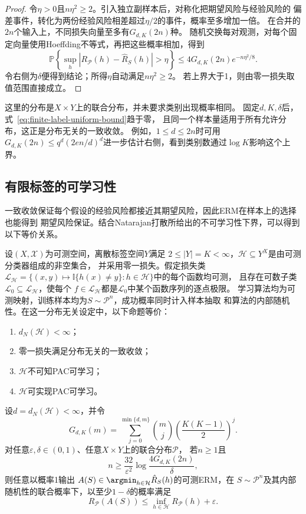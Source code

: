 \begin{proof}
令$\eta>0$且$n\eta^2\geq2$。引入独立副样本后，对称化把期望风险与经验风险的
偏差事件，转化为两份经验风险相差超过$\eta/2$的事件，概率至多增加一倍。
在合并的$2n$个输入上，不同损失向量至多有$G_{d,K}(2n)$种。
随机交换每对观测，对每个固定向量使用Hoeffding不等式，再把这些概率相加，得到
\[
 \mathbb P\!\left\{\sup_h|R_{\mathcal P}(h)-\hat R_S(h)|>\eta\right\}
 \leq4G_{d,K}(2n)e^{-n\eta^2/8}.
\]
令右侧为$\delta$便得到结论；所得$\eta$自动满足$n\eta^2\geq2$。
若上界大于1，则由零一损失取值范围直接成立。
\end{proof}

这里的分布是$X\times Y$上的联合分布，并未要求类别出现概率相同。
固定$d,K,\delta$后，式~\eqref{eq:finite-label-uniform-bound}趋于零，
且同一个样本量适用于所有允许分布，这正是分布无关的一致收敛。
例如，$1\leq d\leq2n$时可用
$G_{d,K}(2n)\leq q^d(2en/d)^d$进一步估计右侧，看到类别数通过$\log K$影响这个上界。

\subsection{有限标签的可学习性}

一致收敛保证每个假设的经验风险都接近其期望风险，因此ERM在样本上的选择也能得到
期望风险保证。结合Natarajan打散所给出的不可学习性下界，可以得到以下等价关系。

\begin{theorem}[有限标签的可学习性刻画]
\label{thm:finite-label-learnability}
设$(X,\mathcal X)$为可测空间，离散标签空间$Y$满足
$2\leq|Y|=K<\infty$，$\mathcal H\subseteq Y^X$是由可测分类器组成的非空集合，
并采用零一损失。假定损失类
$\mathcal L_{\mathcal H}
=\{(x,y)\mapsto\mathbb I\{h(x)\neq y\}:h\in\mathcal H\}$中的每个函数均可测，
且存在可数子类$\mathcal L_0\subseteq\mathcal L_{\mathcal H}$，使每个
$f\in\mathcal L_{\mathcal H}$都是$\mathcal L_0$中某个函数序列的逐点极限。
学习算法均为可测映射，训练样本均为$S\sim\mathcal P^n$，成功概率同时计入样本抽取
和算法的内部随机性。在这一分布无关设定中，以下命题等价：
\begin{enumerate}
 \item $d_N(\mathcal H)<\infty$；
 \item 零一损失满足分布无关的一致收敛；
 \item $\mathcal H$不可知PAC可学习；
 \item $\mathcal H$可实现PAC可学习。
\end{enumerate}

设$d=d_N(\mathcal H)<\infty$，并令
\[
 G_{d,K}(m)=\sum_{j=0}^{\min\{d,m\}}\binom mj
 \left(\frac{K(K-1)}2\right)^j.
\]
对任意$\varepsilon,\delta\in(0,1)$、任意$X\times Y$上的联合分布$\mathcal P$，
若$n\geq1$且
\[
 n\geq\frac{32}{\varepsilon^2}\log\frac{4G_{d,K}(2n)}{\delta},
\]
则任意以概率1输出
$A(S)\in\argmin_{h\in\mathcal H}\hat R_S(h)$的可测ERM，在
$S\sim\mathcal P^n$及其内部随机性的联合概率下，以至少$1-\delta$的概率满足
\[
 R_{\mathcal P}(A(S))\leq\inf_{h\in\mathcal H}R_{\mathcal P}(h)+\varepsilon.
\]
\end{theorem}

